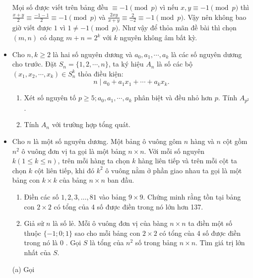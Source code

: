 \documentclass[11pt]{scrartcl}
\begin{document}
\begin{itemize}[label=, leftmargin=0em, itemsep=0.5em]
\begin{sol}
        Mọi số được viết trên bảng đều $\equiv - 1\pmod{p}$ vì nếu $x,y \equiv -1 \pmod{p}$ thì $\frac{x + y}{2} \equiv \frac{-1 - 1}{2} \equiv - 1\pmod{p}$ và $\frac{2xy}{x + y} \equiv \frac{2}{-2} \equiv -1\pmod{p}$. Vậy nên không bao giờ viết được $1$ vì $1 \neq - 1 \pmod{p}$. Như vậy để thỏa mãn đề bài thì chọn $(m,n)$ có dạng $m + n = 2^k$ với $k$ nguyên không âm bất kỳ.\end{sol}
    \item \begin{btvn}
        Cho $n, k \geq 2$ là hai số nguyên dương và $a_0, a_1, \cdots, a_k$ là các số nguyên dương cho trước. Đặt $S_n=\{1,2, \cdots, n\}$, ta ký hiệu $A_n$ là số các bộ $\left(x_1, x_2, \cdots, x_k\right) \in S_n^k$ thỏa điều kiện:
        $$
        n \mid a_0+a_1 x_1+\cdots+a_k x_k .
        $$
        \begin{enumerate}[label=(\alph*)]
            \item Xét số nguyên tố $p \geq 5 ; a_0, a_1, \cdots, a_k$ phân biệt và đều nhỏ hơn $p$. Tính $A_{p^2}$.
            \item Tính $A_n$ với trường hợp tổng quát.
        \end{enumerate}
    \end{btvn}
    \item \begin{bt}
        Cho $n$ là một số nguyên dương. Một bảng ô vuông gôm $n$ hàng và $n$ cột gồm $n^2$ ô vuông đơn vị ta gọi là một bảng $n \times n$.
        Với mỗi số nguyên $k(1 \leq k \leq n)$, trên mỗi hàng ta chọn $k$ hàng liên tiếp và trên mỗi cột ta chọn $k$ cột liên tiếp, khi đó $k^2$ ô vuông nằm ở phần giao nhau ta gọi là một bảng con $k \times k$ của bảng $n \times n$ ban đầu.
        \begin{enumerate}[label=(\alph*)]
            \item Điền các số $1,2,3, \ldots, 81$ vào bảng $9 \times 9$. Chứng minh rằng tồn tại bảng con $2 \times 2$ có tổng của 4 số được điền trong nó lớn hơn 137.
            \item Giả sử $n$ là số lẻ. Mỗi ô vuông đơn vị của bàng $n \times n$ ta điền một số thuộc $\{-1 ; 0 ; 1\}$ sao cho mỗi bảng con $2 \times 2$ có tổng của 4 số được điền trong nó là 0 . Gọi $S$ là tổng của $n^2$ số trong bảng $n \times n$. Tìm giá trị lớn nhất của $S$.
        \end{enumerate}
    \end{bt}
    \begin{sol}
        (a) Gọi 

\end{sol}
\end{itemize}
\end{document}
